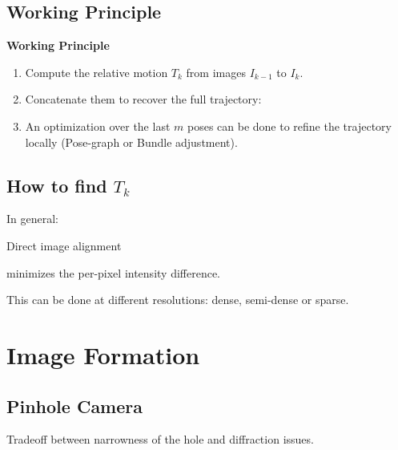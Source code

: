 \documentclass[10pt,a4paper]{scrartcl}
\begin{document}
\begin{multicols*}{2}
\subsection{Working Principle}


\textbf{Working Principle}

\begin{enumerate}
\item Compute the relative motion $T_k$ from images $I_{k-1}$ to $I_k$.
\item Concatenate them to recover the full trajectory:

\item An optimization over the last $m$ poses can be done to refine the trajectory locally (Pose-graph or Bundle adjustment).
\end{enumerate}

\subsection{How to find $T_k$}

In general:


Direct image alignment


minimizes the per-pixel intensity difference.

This can be done at different resolutions: dense, semi-dense or sparse.

\section{Image Formation}

\subsection{Pinhole Camera}

Tradeoff between narrowness of the hole and diffraction issues.


\end{multicols*}
\end{document}
